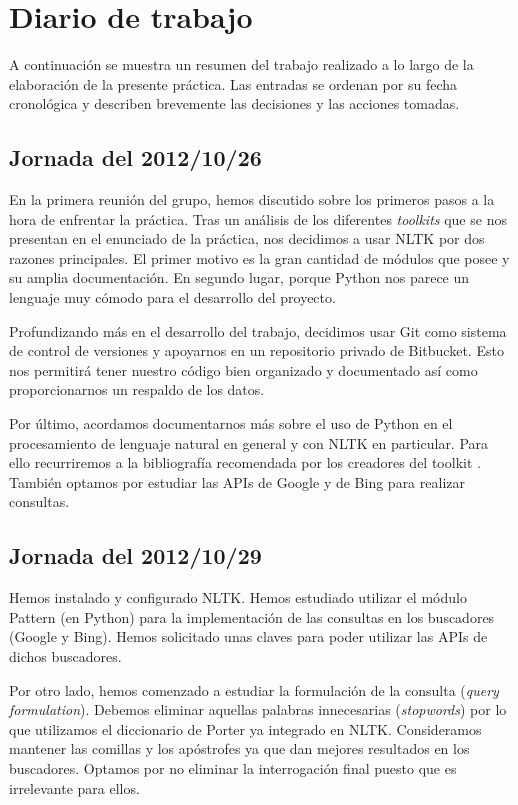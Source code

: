 \documentclass[12pt,a4paper,titlepage]{article}
\begin{document}
\clearpage
\section{Diario de trabajo}
A continuación se muestra un resumen del trabajo realizado a lo largo de la elaboración de la presente práctica. Las entradas se ordenan por su fecha cronológica y describen brevemente las decisiones y las acciones tomadas.


\subsection{Jornada del 2012/10/26}
En la primera reunión del grupo, hemos discutido sobre los primeros pasos a la hora de enfrentar la práctica. Tras un análisis de los diferentes \emph{toolkits} que se nos presentan en el enunciado de la práctica, nos decidimos a usar NLTK por dos razones principales. El primer motivo es la gran cantidad de módulos que posee y su amplia documentación. En segundo lugar, porque Python nos parece un lenguaje muy cómodo para el desarrollo del proyecto.

Profundizando más en el desarrollo del trabajo, decidimos usar Git como sistema de control de versiones y apoyarnos en un repositorio privado de Bitbucket. Esto nos permitirá tener nuestro código bien organizado y documentado así como proporcionarnos un respaldo de los datos.

Por último, acordamos documentarnos más sobre el uso de Python en el procesamiento de lenguaje natural en general y con NLTK en particular. Para ello recurriremos a la bibliografía recomendada por los creadores del toolkit \cite{nltk-book}. También optamos por estudiar las APIs de Google y de Bing para realizar consultas.

\subsection{Jornada del 2012/10/29}
Hemos instalado y configurado NLTK. Hemos estudiado utilizar el módulo Pattern (en Python) para la implementación de las consultas en los buscadores (Google y Bing). Hemos solicitado unas claves para poder utilizar las APIs de dichos buscadores.

Por otro lado, hemos comenzado a estudiar la formulación de la consulta (\emph{query formulation}). Debemos eliminar aquellas palabras innecesarias (\emph{stopwords}) por lo que utilizamos el diccionario de Porter ya integrado en NLTK. Consideramos mantener las comillas y los apóstrofes ya que dan mejores resultados en los buscadores. Optamos por no eliminar la interrogación final puesto que es irrelevante para ellos.
\end{document}
